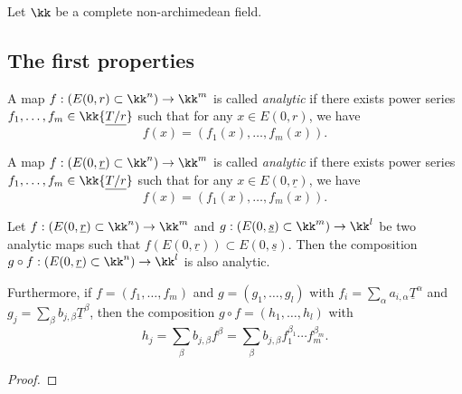 
Let \(\kk\) be a complete non-archimedean field.

\subsection{The first properties}


    \begin{definition}\label{def:analytic_function_on_closed_subset_of_k^n}
        A map \(f:(E(0,r) \subset \kk^n) \to \kk^m\) is called \emph{analytic} 
        if there exists power series \(f_1,\ldots,f_m \in \kk\{\underline{T/r}\}\) 
        such that for any \(x \in E(0,r)\), we have
        \[f(x) = (f_1(x),\ldots,f_m(x)).\]
    \end{definition}


    \begin{definition}\label{def:analytic_map_local_version}
        A map \(f:(E(0,\underline{r}) \subset \kk^n) \to \kk^m\) is called \emph{analytic} 
        if there exists power series \(f_1,\ldots,f_m \in \kk\{\underline{T/r}\}\) 
        such that for any \(x \in E(0,\underline{r})\), we have
        \[f(x) = (f_1(x),\ldots,f_m(x)).\]
    \end{definition}

    \begin{proposition}\label{prop:composition_of_analytic_map}
        Let \(f:(E(0,\underline{r}) \subset \kk^n) \to \kk^m\) and 
        \(g:(E(0,\underline{s}) \subset \kk^m) \to \kk^l\) be two analytic maps
        such that \(f(E(0,\underline{r})) \subset E(0,\underline{s})\).
        Then the composition \(g \circ f:(E(0,\underline{r}) \subset \kk^n) \to \kk^l\) is also analytic.
        
        Furthermore, if \(f = (f_1,\ldots,f_m)\) and \(g = (g_1,\ldots,g_l)\) with \(f_i = \sum_{\alpha} a_{i,\alpha} \underline{T}^\alpha\) and \(g_j = \sum_{\beta} b_{j,\beta} \underline{T}^\beta\),
        then the composition \(g \circ f = (h_1,\ldots,h_l)\) with
        \[h_j = \sum_{\beta} b_{j,\beta} f^{\beta} = \sum_{\beta} b_{j,\beta} f_1^{\beta_1} \cdots f_m^{\beta_m}.\]
    \end{proposition}
    \begin{proof}
    \end{proof}


